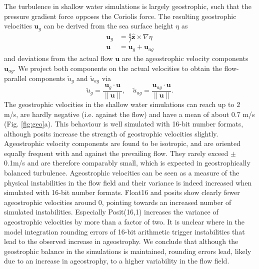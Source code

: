 \documentclass[draft]{agujournal2019}
\begin{document}
The turbulence in shallow water simulations is largely geostrophic, such that the
pressure gradient force opposes the Coriolis force. The resulting geostrophic
velocities $\mathbf{u}_g$ can be derived from the sea surface height $\eta$ as
\begin{subequations}
\begin{align}
\mathbf{u}_g &= \frac{g}{f}\hat{\mathbf{z}} \times \nabla \eta \\
\mathbf{u} &= \mathbf{u}_{g} + \mathbf{u}_{ag}
\end{align}
\label{eq:geo}%
\end{subequations}
and deviations from the actual flow $\mathbf{u}$ are the ageostrophic velocity
components $\mathbf{u}_{ag}$. We project both components on the actual velocities
to obtain the flow-parallel components $\tilde{u}_{g}$ and $\tilde{u}_{ag}$ via
\begin{equation}
\tilde{u}_g = \frac{\mathbf{u}_g \cdot \mathbf{u}}{\| \mathbf{u} \|},
\quad \tilde{u}_{ag} = \frac{\mathbf{u}_{ag} \cdot \mathbf{u}}{\| \mathbf{u} \|}.
\label{eq:parallel}%
\end{equation}
The geostrophic velocities in the shallow water simulations can reach up to 2 m/s,
are hardly negative (i.e. against the flow) and have a mean of about 0.7 m/s
(Fig. \ref{fig:geo}a). This behaviour is well simulated with 16-bit number formats,
although posits increase the strength of geostrophic velocities slightly. Ageostrophic
velocity components are found to be isotropic, and are oriented equally frequent
with and against the prevailing flow. They rarely exceed $\pm$0.1m/s and are
therefore comparably small, which is expected in geostrophically balanced turbulence.
Ageostrophic velocities can be seen as a measure of the physical instabilities in
the flow field and their variance is indeed increased when simulated with
16-bit number formats. Float16 and posits show clearly fewer ageostrophic velocities
around 0, pointing towards an increased number of simulated instabilities.
Especially Posit(16,1) increases the variance of ageostrophic velocities by more
than a factor of two. It is unclear where in the model integration rounding errors
of 16-bit arithmetic trigger instabilities that lead to the observed increase in
ageostrophy. We conclude that although the geostrophic balance in the simulations
is maintained, rounding errors lead, likely due to an increase in ageostrophy,
to a higher variability in the flow field.
\end{document}
